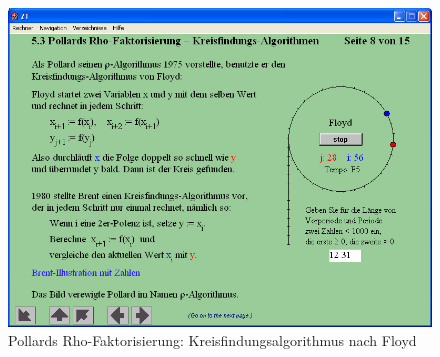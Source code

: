 \begin{refsegment}
\begin{figure}[ht]
\begin{center}
\includegraphics[scale=0.4]{figures/NT_Fig_C5-3_PollardRho}
\caption{Pollards Rho-Faktorisierung: Kreisfindungsalgorithmus nach Floyd}
\label{NT_Fig_C5.3_PollardRho}
\end{center}
\end{figure}



\printbibliography[%
	heading=subbibintoc,
	title={Literatur zu Kapitel \thechapter},
	segment=\therefsegment,
]


\end{refsegment}
